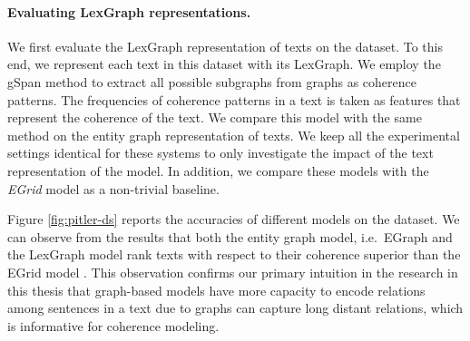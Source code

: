 \paragraph{Evaluating LexGraph representations.} 
We first evaluate the LexGraph representation of texts on the \pitlerds dataset. 
To this end, we represent each text in this dataset with its LexGraph. 
We employ the gSpan method to extract all possible subgraphs from graphs as coherence patterns. 
The frequencies of coherence patterns in a text is taken as features that represent the coherence of the text. 
We compare this model with the same method on the entity graph representation of texts. 
We keep all the experimental settings identical for these systems to only investigate the impact of the text representation of the model. 
In addition, we compare these models with 
the \emph{EGrid} model \cite{barzilay08} as a non-trivial baseline.  

Figure \ref{fig:pitler-ds} reports the accuracies of different models on the \pitlerds dataset. 
We can observe from the results that both the entity graph model, i.e.\ EGraph and the LexGraph model rank texts with respect to their coherence superior than the EGrid model \cite{barzilay08}.  
This observation confirms our primary intuition in the research in this thesis that graph-based models have more capacity to encode relations among sentences in a text due to graphs can capture long distant relations, which is informative for coherence modeling.  


